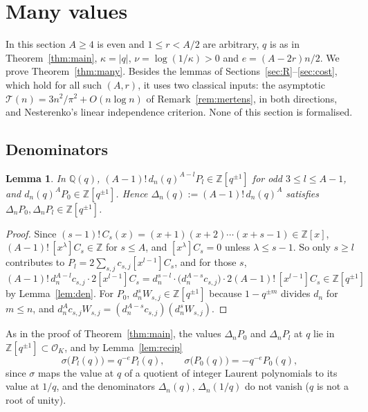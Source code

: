 \documentclass[11pt]{amsart}
\newtheorem{lemma}[theorem]{Lemma}
\theoremstyle{definition}
\theoremstyle{remark}
\numberwithin{equation}{section}
\newcommand{\ZZ}{\mathbb{Z}}
\newcommand{\QQ}{\mathbb{Q}}
\newcommand{\cO}{\mathcal{O}}
\newcommand{\Tot}{\mathcal T}
\begin{document}
\section{Many values}\label{sec:many}

In this section $A\ge4$ is even and $1\le r<A/2$ are arbitrary, $q$ is as in Theorem~\ref{thm:main}, $\kappa=|q|$,
$\nu=\log(1/\kappa)>0$ and $e=(A-2r)n/2$. We prove Theorem~\ref{thm:many}. Besides the lemmas of
Sections~\ref{sec:R}--\ref{sec:cost}, which hold for all such $(A,r)$, it uses two classical inputs: the asymptotic
$\Tot(n)=3n^2/\pi^2+O(n\log n)$ of Remark~\ref{rem:mertens}, in both directions, and Nesterenko's linear independence
criterion. None of this section is formalised.

\subsection*{Denominators}

\begin{lemma}\label{lem:dengen}
In $\QQ(q)$, $(A-1)!\,d_n(q)^{A-l}P_l\in\ZZ[q^{\pm1}]$ for odd $3\le l\le A-1$, and $d_n(q)^AP_0\in\ZZ[q^{\pm1}]$.
Hence $\Delta_n(q):=(A-1)!\,d_n(q)^A$ satisfies $\Delta_nP_0,\Delta_nP_l\in\ZZ[q^{\pm1}]$.
\end{lemma}

\begin{proof}
Since $(s-1)!\,C_s(x)=(x+1)(x+2)\cdots(x+s-1)\in\ZZ[x]$, $(A-1)!\,[x^\lambda]C_s\in\ZZ$ for $s\le A$, and
$[x^\lambda]C_s=0$ unless $\lambda\le s-1$. So only $s\ge l$ contributes to $P_l=2\sum_{s,j}c_{s,j}[x^{l-1}]C_s$, and
for those $s$,
\[
(A-1)!\,d_n^{A-l}c_{s,j}\cdot2[x^{l-1}]C_s=d_n^{s-l}\cdot\bigl(d_n^{A-s}c_{s,j}\bigr)\cdot2(A-1)!\,[x^{l-1}]C_s
\in\ZZ[q^{\pm1}]
\]
by Lemma~\ref{lem:den}. For $P_0$, $d_n^sW_{s,j}\in\ZZ[q^{\pm1}]$ because $1-q^{\pm m}$ divides $d_n$ for $m\le n$, and
$d_n^Ac_{s,j}W_{s,j}=(d_n^{A-s}c_{s,j})(d_n^sW_{s,j})$.
\end{proof}

As in the proof of Theorem~\ref{thm:main}, the values $\Delta_nP_0$ and $\Delta_nP_l$ at $q$ lie in $\ZZ[q^{\pm1}]\subset
\cO_K$, and by Lemma~\ref{lem:recip}
\begin{equation}\label{eq:sigmaP}
\sigma\bigl(P_l(q)\bigr)=q^{-e}P_l(q),\qquad\sigma\bigl(P_0(q)\bigr)=-q^{-e}P_0(q),
\end{equation}
since $\sigma$ maps the value at $q$ of a quotient of integer Laurent polynomials to its value at $1/q$, and the
denominators $\Delta_n(q)$, $\Delta_n(1/q)$ do not vanish ($q$ is not a root of unity).
\end{document}
